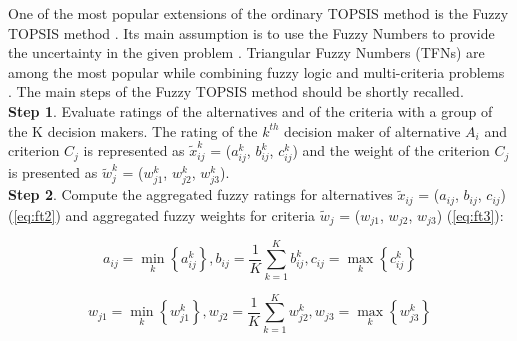 One of the most popular extensions of the ordinary TOPSIS method is the Fuzzy TOPSIS method \cite{salih2019survey}. Its main assumption is to use the Fuzzy Numbers to provide the uncertainty in the given problem \cite{salabun2020handling}. Triangular Fuzzy Numbers (TFNs) are among the most popular while combining fuzzy logic and multi-criteria problems \cite{nuaduaban2016fuzzy}. The main steps of the Fuzzy TOPSIS method should be shortly recalled. \\



\noindent \textbf{Step 1}. Evaluate ratings of the alternatives and of the criteria with a group of the K decision makers. The rating of the $k^{th}$ decision maker of alternative $A_{i}$ and criterion $C_{j}$ is represented as $\tilde{x}^{k}_{ij}$ = (${a}^{k}_{ij}$, ${b}^{k}_{ij}$, ${c}^{k}_{ij}$) and the weight of the criterion $C_{j}$ is presented as $\tilde{w}^{k}_{j}$ = (${w}^{k}_{j1}$, ${w}^{k}_{j2}$, ${w}^{k}_{j3}$). \\

\noindent \textbf{Step 2}. Compute the aggregated fuzzy ratings for alternatives $\tilde{x}_{ij}$ = ($a_{ij}$, $b_{ij}$, $c_{ij}$) (\ref{eq:ft2}) and aggregated fuzzy weights for criteria $\tilde{w}_{j}$ = ($w_{j1}$, $w_{j2}$, $w_{j3}$) (\ref{eq:ft3}):

\begin{equation}
a_{i j}=\min _{k}\left\{a_{i j}^{k}\right\}, b_{i j}=\frac{1}{K} \sum_{k=1}^{K} b_{i j}^{k}, c_{i j}=\max _{k}\left\{c_{i j}^{k}\right\}
\label{eq:ft2}
\end{equation}

\begin{equation}
w_{j 1}=\min _{k}\left\{w_{j 1}^{k}\right\}, w_{j 2}=\frac{1}{K} \sum_{k=1}^{K} w_{j 2}^{k}, w_{j 3}=\max _{k}\left\{w_{j 3}^{k}\right\}
\label{eq:ft3}
\end{equation}

